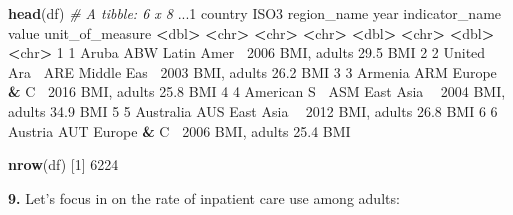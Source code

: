 \documentclass[]{book}
\newenvironment{Shaded}{\begin{snugshade}}{\end{snugshade}}
\newcommand{\CommentTok}[1]{\textcolor[rgb]{0.56,0.35,0.01}{\textit{#1}}}
\newcommand{\DecValTok}[1]{\textcolor[rgb]{0.00,0.00,0.81}{#1}}
\newcommand{\ErrorTok}[1]{\textcolor[rgb]{0.64,0.00,0.00}{\textbf{#1}}}
\newcommand{\FloatTok}[1]{\textcolor[rgb]{0.00,0.00,0.81}{#1}}
\newcommand{\KeywordTok}[1]{\textcolor[rgb]{0.13,0.29,0.53}{\textbf{#1}}}
\newcommand{\NormalTok}[1]{#1}
\newcommand{\OperatorTok}[1]{\textcolor[rgb]{0.81,0.36,0.00}{\textbf{#1}}}
\newcommand{\StringTok}[1]{\textcolor[rgb]{0.31,0.60,0.02}{#1}}
\begin{document}
\begin{Shaded}
\begin{Highlighting}[]
\KeywordTok{head}\NormalTok{(df)}
\CommentTok{# A tibble: 6 x 8}
\NormalTok{   ...}\DecValTok{1}\NormalTok{ country     ISO3  region_name  year indicator_name value unit_of_measure}
  \OperatorTok{<}\NormalTok{dbl}\OperatorTok{>}\StringTok{ }\ErrorTok{<}\NormalTok{chr}\OperatorTok{>}\StringTok{       }\ErrorTok{<}\NormalTok{chr}\OperatorTok{>}\StringTok{ }\ErrorTok{<}\NormalTok{chr}\OperatorTok{>}\StringTok{       }\ErrorTok{<}\NormalTok{dbl}\OperatorTok{>}\StringTok{ }\ErrorTok{<}\NormalTok{chr}\OperatorTok{>}\StringTok{          }\ErrorTok{<}\NormalTok{dbl}\OperatorTok{>}\StringTok{ }\ErrorTok{<}\NormalTok{chr}\OperatorTok{>}\StringTok{          }
\DecValTok{1}     \DecValTok{1}\NormalTok{ Aruba       ABW   Latin Amer}\OperatorTok{~}\StringTok{  }\DecValTok{2006}\NormalTok{ BMI, adults     }\FloatTok{29.5}\NormalTok{ BMI            }
\DecValTok{2}     \DecValTok{2}\NormalTok{ United Ara}\OperatorTok{~}\StringTok{ }\NormalTok{ARE   Middle Eas}\OperatorTok{~}\StringTok{  }\DecValTok{2003}\NormalTok{ BMI, adults     }\FloatTok{26.2}\NormalTok{ BMI            }
\DecValTok{3}     \DecValTok{3}\NormalTok{ Armenia     ARM   Europe }\OperatorTok{&}\StringTok{ }\NormalTok{C}\OperatorTok{~}\StringTok{  }\DecValTok{2016}\NormalTok{ BMI, adults     }\FloatTok{25.8}\NormalTok{ BMI            }
\DecValTok{4}     \DecValTok{4}\NormalTok{ American S}\OperatorTok{~}\StringTok{ }\NormalTok{ASM   East Asia }\OperatorTok{~}\StringTok{  }\DecValTok{2004}\NormalTok{ BMI, adults     }\FloatTok{34.9}\NormalTok{ BMI            }
\DecValTok{5}     \DecValTok{5}\NormalTok{ Australia   AUS   East Asia }\OperatorTok{~}\StringTok{  }\DecValTok{2012}\NormalTok{ BMI, adults     }\FloatTok{26.8}\NormalTok{ BMI            }
\DecValTok{6}     \DecValTok{6}\NormalTok{ Austria     AUT   Europe }\OperatorTok{&}\StringTok{ }\NormalTok{C}\OperatorTok{~}\StringTok{  }\DecValTok{2006}\NormalTok{ BMI, adults     }\FloatTok{25.4}\NormalTok{ BMI            }

\KeywordTok{nrow}\NormalTok{(df)}
\NormalTok{[}\DecValTok{1}\NormalTok{] }\DecValTok{6224}
\end{Highlighting}
\end{Shaded}

\textbf{9.} Let's focus in on the rate of inpatient care use among adults:

\begin{Shaded}
\end{Shaded}
\end{document}
